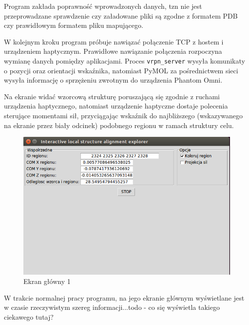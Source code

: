 \documentclass[licencjacka]{pracamgr}
\begin{document}
Program zakłada poprawność wprowadzonych danych, tzn nie jest przeprowadzane sprawdzenie czy załadowane pliki są zgodne z formatem PDB czy prawidłowym formatem pliku mapującego.

W kolejnym kroku program próbuje nawiązać połączenie TCP z hostem i urządzeniem haptycznym. Prawidłowe nawiązanie połączenia rozpoczyna wymianę danych pomiędzy aplikacjami. Proces \texttt{vrpn\_server} wysyła komunikaty o pozycji oraz orientacji wskaźnika, natomiast PyMOL za pośrednictwem sieci wysyła informację o sprzężeniu zwrotnym do urządzenia Phantom Omni. 

Na ekranie widać wzorcową strukturę poruszającą się zgodnie z ruchami urządzenia haptycznego, natomiast urządzenie haptyczne dostaje polecenia sterujące momentami sił, przyciągając wskaźnik do najbliższego (wskazywanego na ekranie przez biały odcinek) podobnego regionu w ramach struktury celu.

\begin{figure}[H]
\centering
\includegraphics[scale=0.7,center]{explorer_stats}
\caption{Ekran główny 1}
\end{figure}

W trakcie normalnej pracy programu, na jego ekranie głównym wyświetlane jest w czasie rzeczywistym szereg informacji...todo - co się wyświetla takiego ciekawego tutaj?
\end{document}

